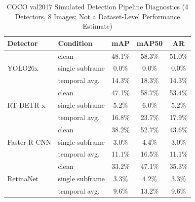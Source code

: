 \documentclass{ieeeaccess}
\begin{document}
\begin{table}[!t]
\caption{COCO val2017 Simulated Detection Pipeline Diagnostics (4 Detectors, 8 Images; Not a Dataset-Level Performance Estimate)}
\label{tab:coco_sim}
\centering
\small
\setlength{\tabcolsep}{5.8pt}
\begin{tabular}{llccc}
\toprule
Detector & Condition & mAP & mAP50 & AR \\
\midrule
\multirow{3}{*}{YOLO26x}
 & clean & 48.1\% & 58.3\% & 51.0\% \\
 & single subframe & 0.0\% & 0.0\% & 0.0\% \\
 & temporal avg. & 14.3\% & 18.3\% & 14.3\% \\
\midrule
\multirow{3}{*}{RT-DETR-x}
 & clean & 47.1\% & 58.7\% & 53.4\% \\
 & single subframe & 5.2\% & 6.0\% & 5.2\% \\
 & temporal avg. & 16.8\% & 23.7\% & 17.9\% \\
\midrule
\multirow{3}{*}{Faster R-CNN}
 & clean & 38.2\% & 52.7\% & 43.6\% \\
 & single subframe & 3.0\% & 4.4\% & 3.0\% \\
 & temporal avg. & 11.1\% & 16.5\% & 11.1\% \\
\midrule
\multirow{3}{*}{RetinaNet}
 & clean & 33.2\% & 47.1\% & 35.3\% \\
 & single subframe & 3.3\% & 4.2\% & 3.3\% \\
 & temporal avg. & 9.6\% & 13.2\% & 9.6\% \\
\bottomrule
\end{tabular}
\end{table}
\end{document}
